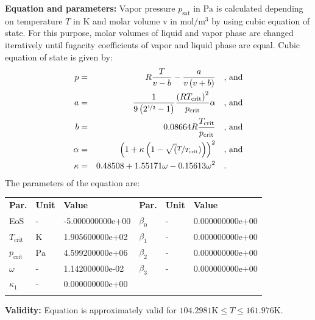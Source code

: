 \textbf{Equation and parameters:}
\newline
%
Vapor pressure $p_\mathrm{sat}$ in $\si{\pascal}$ is calculated depending on temperature $T$ in $\si{\kelvin}$ and molar volume v in $\si{\mole\per\cubic\meter}$ by using cubic equation of state. For this purpose, molar volumes of liquid and vapor phase are changed iteratively until fugacity coefficients of vapor and liquid phase are equal. Cubic equation of state is given by:
\begin{equation*}
\begin{split}
p &=& R \frac{T}{v - b} - \frac{a}{v \left(v + b\right)} & \quad\text{, and} \\
a &=& \frac{1}{9 \left(2^{\nicefrac{1}{3}} - 1\right)} \frac{\left(R T_\mathrm{crit} \right)^2}{p_\mathrm{crit}} \alpha & \quad\text{, and} \\
b &=& 0.08664 R \frac{T_\mathrm{crit}}{p_\mathrm{crit}} & \quad\text{, and} \\
\alpha &=& \left(1 + \kappa \left(1 - \sqrt(\nicefrac{T}{T_\mathrm{crit}}) \right) \right)^2 & \quad\text{, and} \\
\kappa &=& 0.48508 + 1.55171 \omega - 0.15613 \omega^2 & \quad\text{.}
\end{split}
\end{equation*}
%
The parameters of the equation are:
%
\begin{longtable}[l]{lll|lll}
\toprule
\addlinespace
\textbf{Par.} & \textbf{Unit} & \textbf{Value} &	\textbf{Par.} & \textbf{Unit} & \textbf{Value} \\
\addlinespace
\midrule
\endhead

\bottomrule
\endfoot
\bottomrule
\endlastfoot
\addlinespace

EoS & - & -5.000000000e+00 & $\beta_0$ & - & 0.000000000e+00 \\
$T_\mathrm{crit}$ & $\si{\kelvin}$ & 1.905600000e+02 & $\beta_1$ & - & 0.000000000e+00 \\
$p_\mathrm{crit}$ & $\si{\pascal}$ & 4.599200000e+06 & $\beta_2$ & - & 0.000000000e+00 \\
$\omega$ & - & 1.142000000e-02 & $\beta_3$ & - & 0.000000000e+00 \\
$\kappa_1$ & - & 0.000000000e+00 & & & \\

\addlinespace\end{longtable}

\textbf{Validity:}
\newline
Equation is approximately valid for $104.2981 \si{\kelvin} \leq T \leq 161.976 \si{\kelvin}$.
\newline

